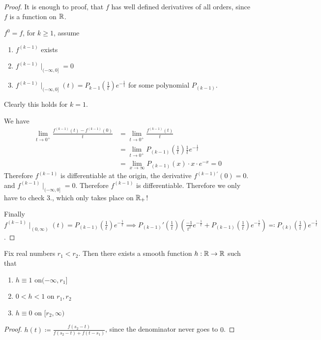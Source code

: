 \begin{proof}
    It is enough to proof, that \(f\) has well defined derivatives of all orders, since \(f\) is a function on \(\mathbb{R}\).

    \(f^0=f\), for  \(k\geq 1\), assume \begin{enumerate}
        \item \(f^{(k-1)}\) exists
        \item \(f^{(k-1)}\mid_{(-\infty,0]}=0\) 
        \item \(f^{(k-1)}\mid_{(-\infty,0]}(t)=P_{k-1}(\frac{1}{t})e^{-\frac{1}{t}}\) for some polynomial \(P_{(k-1)}\).
    \end{enumerate}
    Clearly this holds for \(k=1\). 
    
    We have \begin{align*}
        \lim_{t\to0^+}\frac{f^{(k-1)}(t)-f^{(k-1)}(0)}{t}&=\lim_{t\to 0^+}\frac{f^{(k-1)}(t)}{t}\\
        &=\lim_{t\to 0^+}P_{(k-1)}(\frac{1}{t})\frac{1}{t}e^{-\frac{1}{t}}\\
        &= \lim_{x\to\infty} P_{(k-1)}(x)\cdot x\cdot e^{-x}=0
    \end{align*}
    Therefore \(f^{(k-1)}\) is differentiable at the origin, the derivative \(f^{(k-1)'}(0)=0\).
    and \(f^{(k-1)}\mid_{(-\infty,0]}=0\). Therefore \(f^{(k-1)}\) is differentiable.
    Therefore we only have to check 3., which only takes place on \(\mathbb{R}_+\)! 

    Finally \(f^{(k-1)}\mid_{(0,\infty)}(t)=P_{(k-1)}(\frac{1}{t})e^{-\frac{1}{t}}\implies P_{(k-1)}'(\frac{1}{t})\left(\frac{-1}{t^2}e^{-\frac{1}{t}}+P_{(k-1)}(\frac{1}{t})e^{-\frac{1}{t}}\right)\eqqcolon P_{(k)}(\frac{1}{t})e^{-\frac{1}{t}}\).
\end{proof}

\begin{lemma}\label{lem:2.5}
   Fix real numbers \(r_1<r_2\). Then there exists a smooth function \(h:\mathbb{R}\to\mathbb{R}\) such that 
   \begin{enumerate}
    \item \(h\equiv 1\) on\((-\infty,r_1]\)
    \item\(0<h<1\) on \(r_1,r_2\)
    \item \(h\equiv 0\) on \([r_2,\infty)\)
    \end{enumerate}
\end{lemma}

\begin{proof}
    \(h(t)\coloneqq \frac{f(s_2-t)}{f(s_2-t)+f(t-s_1)}\), since the denominator never goes to \(0\).
\end{proof}

